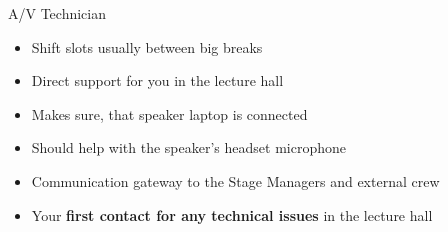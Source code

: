 
\begin{frame}{A/V Technician}
	\begin{itemize}
		\item Shift slots usually between big breaks
		\item Direct support for you in the lecture hall
		\item Makes sure, that speaker laptop is connected
		\item Should help with the speaker's headset microphone
		\item Communication gateway to the Stage Managers and external crew
		\item Your \textbf{first contact for any technical issues} in the lecture hall
	\end{itemize}
\end{frame}
